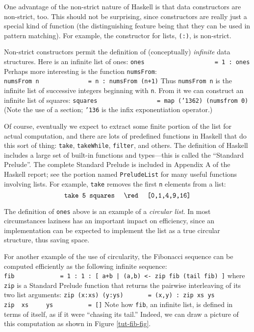 One advantage of the non-strict nature of Haskell is that data
constructors are non-strict, too.  This should not be surprising,
since constructors are really just a special kind of function (the
distinguishing feature being that they can be used in pattern
matching).  For example, the constructor for lists, \mbox{\tt (:)}, is
non-strict.

Non-strict constructors permit the definition of (conceptually) {\em
infinite} data structures.  Here is an infinite list of ones:
\bprog
\mbox{\tt ones\ \ \ \ \ \ \ \ \ \ \ \ \ \ \ \ \ \ \ \ =\ 1\ :\ ones}
\eprog 
Perhaps more interesting is the function \mbox{\tt numsFrom}:
\bprog
\mbox{\tt numsFrom\ n\ \ \ \ \ \ \ \ \ \ \ \ \ \ =\ n\ :\ numsFrom\ (n+1)}
\eprog 
Thus \mbox{\tt numsFrom\ n} is the infinite list of successive integers
beginning with \mbox{\tt n}.  From it we can construct an infinite list of
squares:
\bprog
\mbox{\tt squares\ \ \ \ \ \ \ \ \ \ \ \ \ \ \ \ \ =\ map\ ({\char'136}2)\ (numsfrom\ 0)}
\eprog 
(Note the use of a section; \mbox{\tt {\char'136}} is the infix exponentiation operator.)

Of course, eventually we expect to extract some finite portion of the
list for actual computation, and there are lots of predefined
functions in Haskell that do this sort of thing: \mbox{\tt take}, \mbox{\tt takeWhile},
\mbox{\tt filter}, and others.  The definition of Haskell includes a large set
of built-in functions and types---this is called the ``Standard
Prelude''.   The complete Standard Prelude is included in Appendix A of
the Haskell report; see the portion named \mbox{\tt PreludeList} for many
useful functions involving lists.  For example, \mbox{\tt take} removes the first \mbox{\tt n} 
elements from a list:
\[ \mbox{\tt take\ 5\ squares}\ \ \ \ \red\ \ \ \ \mbox{\tt [0,1,4,9,16]} \]

The definition of \mbox{\tt ones} above is an example of a {\em circular list}.
In most circumstances laziness has an important impact on efficiency,
since an implementation can be expected to implement the list as a
true circular structure, thus saving space.  

For another example of the use of circularity, the Fibonacci sequence
can be computed efficiently as the following infinite sequence:
\bprog
\mbox{\tt fib\ \ \ \ \ \ \ \ \ \ \ \ \ =\ 1\ :\ 1\ :\ [\ a+b\ |\ (a,b)\ <-\ zip\ fib\ (tail\ fib)\ ]}
\eprog 
where \mbox{\tt zip} is a Standard Prelude function that returns the pairwise
interleaving of its two list arguments:
\bprog
\mbox{\tt zip\ (x:xs)\ (y:ys)\ \ \ \ \ \ \ =\ (x,y)\ :\ zip\ xs\ ys}\\
\mbox{\tt zip\ \ xs\ \ \ \ \ ys\ \ \ \ \ \ \ \ \ \ =\ []}
\eprog
Note how \mbox{\tt fib}, an infinite list, is defined in terms of itself, as if
it were ``chasing its tail.''  Indeed, we can draw a picture of this
computation as shown in Figure \ref{tut-fib-fig}.


